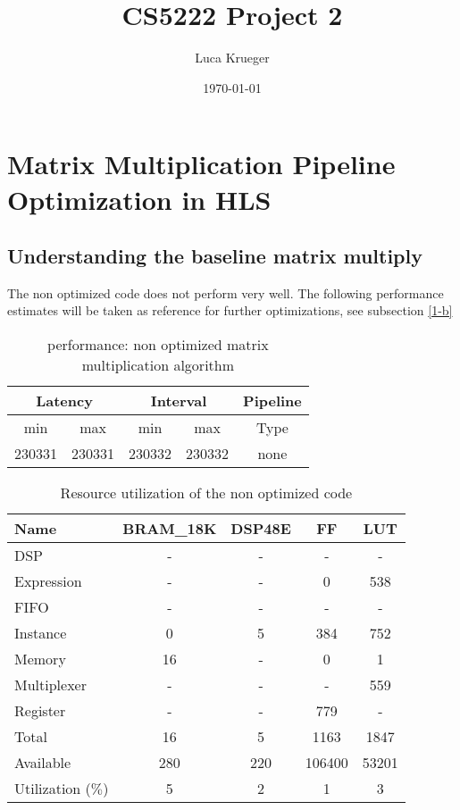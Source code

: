 \documentclass{article}
\title{CS5222 Project 2}
\author{Luca Krueger}
\date{\today}
\begin{document}
\maketitle

\section{Matrix Multiplication Pipeline Optimization in HLS}
\subsection{Understanding the baseline matrix multiply}

The non optimized code does not perform very well. The following performance estimates will be taken as reference for further optimizations, see subsection \ref{1-b}
\begin{table}[H]
	\centering
	\begin{tabular}{ccccc}
		\multicolumn{2}{c}{Latency} & \multicolumn{2}{c}{Interval} & Pipeline\\
		\hline
		min  &   max  &   min  &   max  &   Type  \\
		230331&  230331&  230332&  230332&   none  
	\end{tabular}
	\caption{performance: non optimized matrix multiplication algorithm}
	\label{1-a-perf-table}
\end{table}

\begin{table}[H]
	\centering
	\begin{tabular}{lcccc}
		Name      & BRAM\_18K& DSP48E&   FF   &  LUT  \\
		\hline
		DSP              &        -&      -&       -&      -\\
		Expression       &        -&      -&       0&    538\\
		FIFO             &        -&      -&       -&      -\\
		Instance         &        0&      5&     384&    752\\
		Memory           &       16&      -&       0&      1\\
		Multiplexer      &        -&      -&       -&    559\\
		Register         &        -&      -&     779&      -\\
		\hline
		Total            &       16&      5&    1163&   1847\\
		Available        &      280&    220&  106400&  53201\\
		\hline
		Utilization ($\%$)  &        5&      2&       1&      3
	\end{tabular}
	\caption{Resource utilization of the non optimized code}
	\label{1-a-resources}
\end{table}
\end{document}
